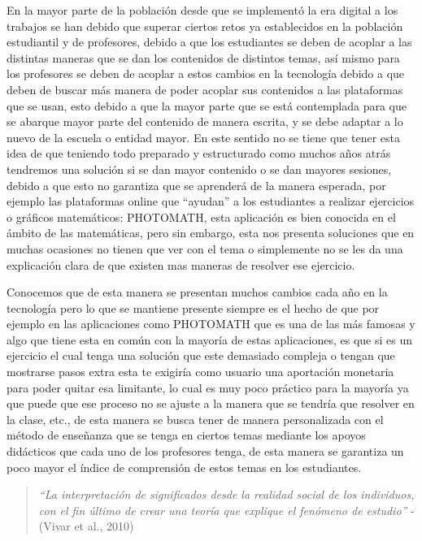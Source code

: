 \documentclass{article}
\begin{document}
En la mayor parte de la población desde que se implementó la era digital a los trabajos se han debido que superar ciertos retos ya establecidos en la población estudiantil y de profesores, debido a que los estudiantes se deben de acoplar a las distintas maneras que se dan los contenidos de distintos temas, así mismo para los profesores se deben de acoplar a estos cambios en la tecnología debido a que deben de buscar más manera de poder acoplar sus contenidos a las plataformas que se usan, esto debido a que la mayor parte que se está contemplada para que se abarque mayor parte del contenido de manera escrita, y se debe adaptar a lo nuevo de la escuela o entidad mayor. En este sentido no se tiene que tener esta idea de que teniendo todo preparado y estructurado como  muchos años atrás tendremos una solución si se dan mayor contenido o se dan mayores sesiones, debido a que esto no garantiza que se aprenderá de la manera esperada, por ejemplo las plataformas online que “ayudan” a los estudiantes a realizar ejercicios o gráficos matemáticos: PHOTOMATH, esta aplicación es bien conocida en el ámbito de las matemáticas, pero sin embargo, esta nos presenta soluciones que en muchas ocasiones no tienen que ver con el tema o simplemente no se les da una explicación clara de que existen mas maneras de resolver ese ejercicio.

Conocemos que de esta manera se presentan muchos cambios cada año en la tecnología pero lo que se mantiene presente siempre es el hecho de que por ejemplo en las aplicaciones como PHOTOMATH que es una de las más famosas y algo que tiene esta en común con la mayoría de estas aplicaciones, es que si es un ejercicio el cual tenga una solución que este demasiado compleja o tengan que mostrarse pasos extra esta te exigiría como usuario una aportación monetaria para poder quitar esa limitante, lo cual es muy poco práctico para la mayoría ya que puede que ese proceso no se ajuste a la manera que se tendría que resolver en la clase, etc., de esta manera se busca tener de manera personalizada con el método de enseñanza que se tenga en ciertos temas mediante los apoyos didácticos que cada uno de los profesores tenga, de esta manera se garantiza un poco mayor el índice de comprensión de estos temas en los estudiantes.

\begin{quote}
    \textit{“La interpretación de significados desde la realidad social de los individuos, con el fin último de crear una teoría que explique el fenómeno de estudio”} \cite{Vivar} - (Vivar et al., 2010)
\end{quote}
\end{document}

